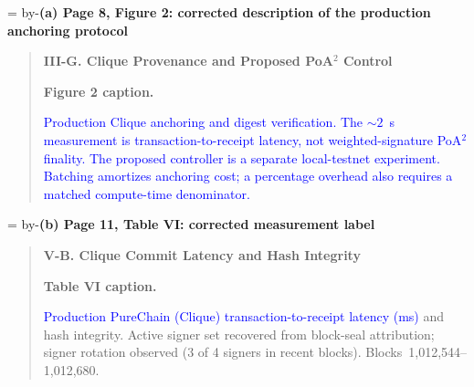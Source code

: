 \documentclass[11pt]{article}
\newenvironment{excerpt}{\begin{quote}\small\sloppy}{\end{quote}}
\newcommand{\roomfor}[1]{\par\begingroup\dimen0=\pagegoal\advance\dimen0 by-\pagetotal\ifdim\dimen0<#1\baselineskip\newpage\fi\endgroup}
\newcommand{\loc}[1]{\roomfor{7}\medskip\noindent\textbf{#1}\par\smallskip}
\newcommand{\mshead}[2]{\par\noindent\textbf{#1. #2}\par\smallskip}
\begin{document}
\clearpage
\loc{(a) Page 8, Figure 2: corrected description of the production anchoring protocol}
\begin{excerpt}
\mshead{III-G}{Clique Provenance and Proposed PoA$^2$ Control}
\begin{minipage}{\linewidth}
\begin{center}
\end{center}
\textbf{Figure 2 caption.}

\textcolor{blue}{Production
Clique anchoring and digest verification. The ${\sim}2$~s
measurement is transaction-to-receipt latency, not weighted-signature
PoA$^2$ finality. The proposed controller is a separate local-testnet
experiment. Batching amortizes anchoring cost; a percentage overhead
also requires a matched compute-time denominator.}
\end{minipage}
\end{excerpt}

\loc{(b) Page 11, Table VI: corrected measurement label}
\begin{excerpt}
\mshead{V-B}{Clique Commit Latency and Hash Integrity}
\textbf{Table VI caption.}

\textcolor{blue}{Production PureChain (Clique) transaction-to-receipt latency (ms)} and hash
integrity. Active signer set recovered from
block-seal attribution; signer rotation observed (3 of 4 signers in recent blocks).
Blocks~1{,}012{,}544--1{,}012{,}680.
\end{excerpt}
\end{document}
